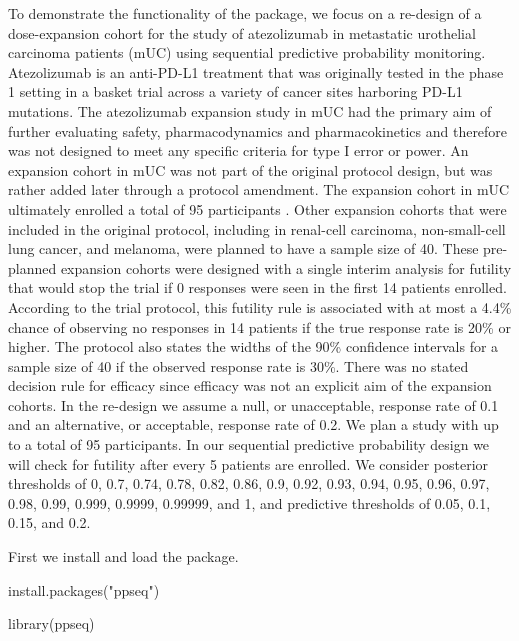 To demonstrate the functionality of the  package, we focus on
a re-design of a dose-expansion cohort for the study of atezolizumab in
metastatic urothelial carcinoma patients (mUC) using sequential
predictive probability monitoring. Atezolizumab is an anti-PD-L1
treatment that was originally tested in the phase 1 setting in a basket
trial across a variety of cancer sites harboring PD-L1 mutations. The
atezolizumab expansion study in mUC had the primary aim of further
evaluating safety, pharmacodynamics and pharmacokinetics and therefore
was not designed to meet any specific criteria for type I error or
power. An expansion cohort in mUC was not part of the original protocol
design, but was rather added later through a protocol amendment. The
expansion cohort in mUC ultimately enrolled a total of 95 participants
\citep{Powles2014}. Other expansion cohorts that were included in the
original protocol, including in renal-cell carcinoma, non-small-cell
lung cancer, and melanoma, were planned to have a sample size of 40.
These pre-planned expansion cohorts were designed with a single interim
analysis for futility that would stop the trial if 0 responses were seen
in the first 14 patients enrolled. According to the trial protocol, this
futility rule is associated with at most a 4.4\% chance of observing no
responses in 14 patients if the true response rate is 20\% or higher.
The protocol also states the widths of the 90\% confidence intervals for
a sample size of 40 if the observed response rate is 30\%. There was no
stated decision rule for efficacy since efficacy was not an explicit aim
of the expansion cohorts. In the re-design we assume a null, or
unacceptable, response rate of 0.1 and an alternative, or acceptable,
response rate of 0.2. We plan a study with up to a total of 95
participants. In our sequential predictive probability design we will
check for futility after every 5 patients are enrolled. We consider
posterior thresholds of 0, 0.7, 0.74, 0.78, 0.82, 0.86, 0.9, 0.92, 0.93,
0.94, 0.95, 0.96, 0.97, 0.98, 0.99, 0.999, 0.9999, 0.99999, and 1, and
predictive thresholds of 0.05, 0.1, 0.15, and 0.2.

First we install and load the  package.

\begin{Schunk}
\begin{Sinput}
install.packages("ppseq")
\end{Sinput}
\end{Schunk}

\begin{Schunk}
\begin{Sinput}
library(ppseq)
\end{Sinput}
\end{Schunk}

